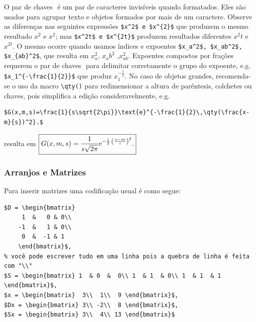 O par de chaves $\qty{}$ é um par de caracteres invisíveis quando formatados. Eles são usados para agrupar texto e objetos formados por mais de um caractere. Observe as diferenças nas seguintes expressões
\verb|$x^2$ e $x^{2}$| que produzem o mesmo resultado $x^2$ e $x^{2}$; mas \verb|$x^2t$ e $x^{2t}$| produzem resultados diferentes $x^2t$ e $x^{2t}$. O mesmo ocorre quando usamos índices e expoentes   \verb|$x_a^2$, $x_ab^2$, $x_{ab}^2$|, que resulta em $x_a^2$, $x_ab^2$ ,$x_{ab}^2$. Expoentes compostos por frações requerem o par de chaves $\qty{}$ para delimitar corretamente o grupo do expoente, e.g. \verb|$x_1^{-\frac{1}{2}}$| que produz $x_1^{-\frac{1}{2}}$. No caso de objetos grandes, recomenda-se o uso da macro \verb|\qty()| para redimensionar a altura de parêntesis, colchetes ou chaves, pois simplifica a edição consideravelmente, e.g.

\begin{lstlisting}[language={[Latex]Tex},frame=single,numbers =none]
$G(x,m,s)=\frac{1}{s\sqrt{2\pi}}\text{e}^{-\frac{1}{2}\,\qty(\frac{x-m}{s})^2}.$
\end{lstlisting} 
resulta em $\boxed{G(x,m,s)=\frac{1}{s\sqrt{2\pi}}\text{e}^{-\frac{1}{2}\,\qty(\frac{x-m}{s})^2}.}$

\subsubsection{Arranjos e Matrizes}
Para inserir matrizes  uma codificação usual é como segue:
\begin{lstlisting}[language={[Latex]Tex},frame=single,numbers =none]
$D = \begin{bmatrix} 
	 1  &   0 & 0\\
	-1  &   1 & 0\\
	 0  &  -1 & 1
	\end{bmatrix}$, 
% você pode escrever tudo em uma linha pois a quebra de linha é feita com "\\"
$S = \begin{bmatrix} 1  & 0  &  0\\ 1  & 1  & 0\\ 1  & 1  & 1 \end{bmatrix}$,
$x = \begin{bmatrix}  3\\  1\\  9 \end{bmatrix}$,   
$Dx = \begin{bmatrix} 3\\ -2\\  8 \end{bmatrix}$, 
$Sx = \begin{bmatrix} 3\\  4\\ 13 \end{bmatrix}$
\end{lstlisting}


